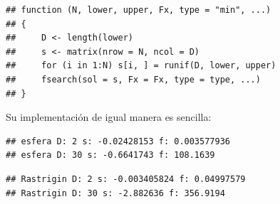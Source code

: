 \documentclass[11pt,]{article}
\newenvironment{Shaded}{\begin{snugshade}}{\end{snugshade}}
\newcommand{\CharTok}[1]{\textcolor[rgb]{0.31,0.60,0.02}{#1}}
\newcommand{\CommentTok}[1]{\textcolor[rgb]{0.56,0.35,0.01}{\textit{#1}}}
\newcommand{\ControlFlowTok}[1]{\textcolor[rgb]{0.13,0.29,0.53}{\textbf{#1}}}
\newcommand{\DecValTok}[1]{\textcolor[rgb]{0.00,0.00,0.81}{#1}}
\newcommand{\FloatTok}[1]{\textcolor[rgb]{0.00,0.00,0.81}{#1}}
\newcommand{\KeywordTok}[1]{\textcolor[rgb]{0.13,0.29,0.53}{\textbf{#1}}}
\newcommand{\NormalTok}[1]{#1}
\newcommand{\OperatorTok}[1]{\textcolor[rgb]{0.81,0.36,0.00}{\textbf{#1}}}
\newcommand{\StringTok}[1]{\textcolor[rgb]{0.31,0.60,0.02}{#1}}
\begin{document}
\begin{verbatim}
## function (N, lower, upper, Fx, type = "min", ...) 
## {
##     D <- length(lower)
##     s <- matrix(nrow = N, ncol = D)
##     for (i in 1:N) s[i, ] = runif(D, lower, upper)
##     fsearch(sol = s, Fx = Fx, type = type, ...)
## }
\end{verbatim}

Su implementación de igual manera es sencilla:

\begin{Shaded}
\end{Shaded}

\begin{verbatim}
## esfera D: 2 s: -0.02428153 f: 0.003577936 
## esfera D: 30 s: -0.6641743 f: 108.1639
\end{verbatim}

\begin{Shaded}
\end{Shaded}

\begin{verbatim}
## Rastrigin D: 2 s: -0.003405824 f: 0.04997579 
## Rastrigin D: 30 s: -2.882636 f: 356.9194
\end{verbatim}

\newpage
\singlespacing 
\end{document}
